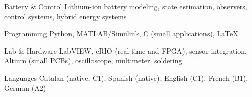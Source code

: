 

\begin{cvskills}

  \cvskill
    {Battery \& Control}
    {Lithium-ion battery modeling, state estimation, observers, control systems, hybrid energy systems}

  \cvskill
    {Programming}
    {Python, MATLAB/Simulink, C (small applications), LaTeX}

  \cvskill
    {Lab \& Hardware}
    {LabVIEW, cRIO (real-time and FPGA), sensor integration, Altium (small PCBs), oscilloscope, multimeter, soldering}

  \cvskill
    {Languages}
    {Catalan (native, C1), Spanish (native), English (C1), French (B1), German (A2)}

\end{cvskills}
